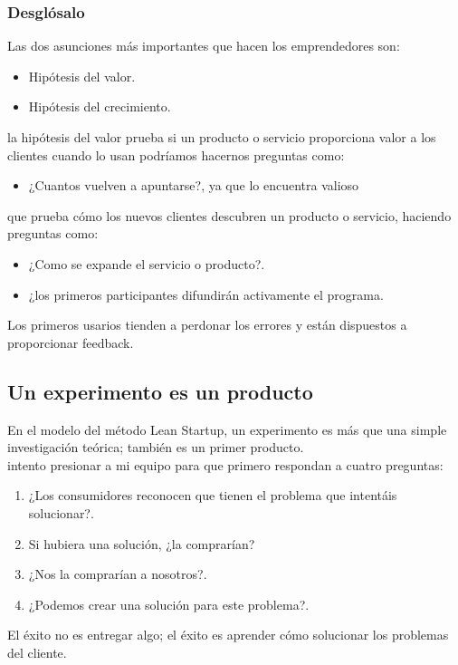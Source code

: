 \documentclass[10pt]{article}
\begin{document}
\begin{multicols}{2}
\subsubsection*{Desglósalo}
Las dos asunciones más importantes que hacen los emprendedores son:
\begin{itemize}
\item Hipótesis del valor.
\item Hipótesis del crecimiento.
\end{itemize}
la hipótesis del valor prueba si un producto o servicio proporciona valor a los clientes cuando lo usan podríamos hacernos preguntas como:
\begin{itemize}
\item ¿Cuantos vuelven a apuntarse?, ya que lo encuentra valioso
\end{itemize}
{\color{blue}{La hipótesis del crecimiento} que prueba cómo los nuevos clientes descubren un producto o servicio, haciendo preguntas como:
\begin{itemize}
\item ¿Como se expande el servicio o producto?.
\item ¿los primeros participantes difundirán activamente el programa.
\end{itemize}}
Los primeros usarios tienden a perdonar los errores y están dispuestos a proporcionar feedback.
\subsection*{Un experimento es un producto}
En el modelo del método Lean Startup, un experimento es más que una simple investigación teórica; también es un primer producto.\\
intento presionar a mi equipo para que primero respondan a cuatro preguntas:
\begin{enumerate}
\item ¿Los consumidores reconocen que tienen el problema que intentáis solucionar?.
\item Si hubiera una solución, ¿la comprarían?
\item ¿Nos la comprarían a nosotros?.
\item ¿Podemos crear una solución para este problema?.
\end{enumerate}
El éxito no es entregar algo; el éxito es aprender cómo solucionar los problemas del cliente.
\end{multicols}
\end{document}
